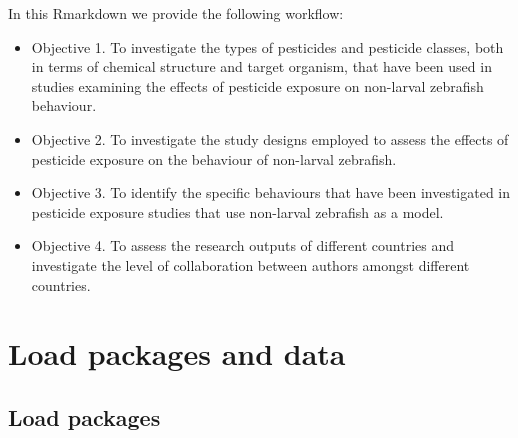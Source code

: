 \documentclass[
]{article}
\subtitle{Supplemental file s2}
\author{}
\date{\vspace{-2.5em}}
\newenvironment{Shaded}{\begin{snugshade}}{\end{snugshade}}
\newcommand{\AttributeTok}[1]{\textcolor[rgb]{0.77,0.63,0.00}{#1}}
\newcommand{\CommentTok}[1]{\textcolor[rgb]{0.56,0.35,0.01}{\textit{#1}}}
\newcommand{\ConstantTok}[1]{\textcolor[rgb]{0.00,0.00,0.00}{#1}}
\newcommand{\FunctionTok}[1]{\textcolor[rgb]{0.00,0.00,0.00}{#1}}
\newcommand{\NormalTok}[1]{#1}
\newcommand{\SpecialCharTok}[1]{\textcolor[rgb]{0.00,0.00,0.00}{#1}}
\begin{document}
In this Rmarkdown we provide the following workflow:

\begin{itemize}
\item
  Objective 1. To investigate the types of pesticides and pesticide
  classes, both in terms of chemical structure and target organism, that
  have been used in studies examining the effects of pesticide exposure
  on non-larval zebrafish behaviour.
\item
  Objective 2. To investigate the study designs employed to assess the
  effects of pesticide exposure on the behaviour of non-larval
  zebrafish.
\item
  Objective 3. To identify the specific behaviours that have been
  investigated in pesticide exposure studies that use non-larval
  zebrafish as a model.
\item
  Objective 4. To assess the research outputs of different countries and
  investigate the level of collaboration between authors amongst
  different countries.
\end{itemize}

\hypertarget{load-packages-and-data}{%
\section{\texorpdfstring{\textbf{Load packages and
data}}{Load packages and data}}\label{load-packages-and-data}}

\hypertarget{load-packages}{%
\subsection{Load packages}\label{load-packages}}

\begin{Shaded}
\end{Shaded}
\end{document}
